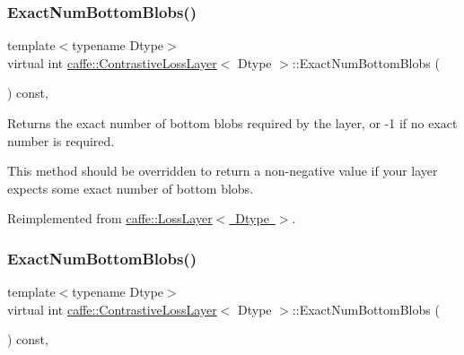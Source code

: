 \subsubsection{\texorpdfstring{Exact\+Num\+Bottom\+Blobs()}{ExactNumBottomBlobs()}\hspace{0.1cm}{\footnotesize\ttfamily [1/2]}}
{\footnotesize\ttfamily template$<$typename Dtype$>$ \\
virtual int \mbox{\hyperlink{classcaffe_1_1_contrastive_loss_layer}{caffe\+::\+Contrastive\+Loss\+Layer}}$<$ Dtype $>$\+::Exact\+Num\+Bottom\+Blobs (\begin{DoxyParamCaption}{ }\end{DoxyParamCaption}) const\hspace{0.3cm}{\ttfamily [inline]}, {\ttfamily [virtual]}}



Returns the exact number of bottom blobs required by the layer, or -\/1 if no exact number is required. 

This method should be overridden to return a non-\/negative value if your layer expects some exact number of bottom blobs. 

Reimplemented from \mbox{\hyperlink{classcaffe_1_1_loss_layer_af1620064baefb711e2c767bdc92b6fb1}{caffe\+::\+Loss\+Layer$<$ Dtype $>$}}.

\mbox{\label{classcaffe_1_1_contrastive_loss_layer_aa6f3ad6918e64ffa1828e821accf25e9}} 
\subsubsection{\texorpdfstring{Exact\+Num\+Bottom\+Blobs()}{ExactNumBottomBlobs()}\hspace{0.1cm}{\footnotesize\ttfamily [2/2]}}
{\footnotesize\ttfamily template$<$typename Dtype$>$ \\
virtual int \mbox{\hyperlink{classcaffe_1_1_contrastive_loss_layer}{caffe\+::\+Contrastive\+Loss\+Layer}}$<$ Dtype $>$\+::Exact\+Num\+Bottom\+Blobs (\begin{DoxyParamCaption}{ }\end{DoxyParamCaption}) const\hspace{0.3cm}{\ttfamily [inline]}, {\ttfamily [virtual]}}



